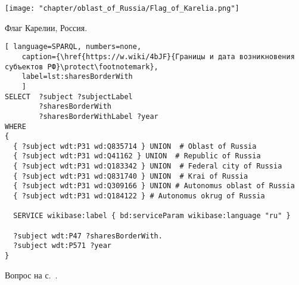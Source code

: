 \begin{task}
	\label{answer:subjects_of_Russia_1}
	
	\begin{marginfigure}[0.0cm]
{
	\setlength{\fboxsep}{0pt}%
	\setlength{\fboxrule}{1pt}%
	\texttt{[image: "chapter/oblast\_of\_Russia/Flag\_of\_Karelia.png"]}
}
\caption [Флаг Карелии, Россия.]{Флаг Карелии, Россия.}%
\label{fig:Flag_of_Karelia}%
\end{marginfigure}
	
	\begin{lstlisting}[ language=SPARQL, numbers=none,
	caption={\href{https://w.wiki/4bJF}{Границы и дата возникновения субъектов РФ}\protect\footnotemark},
	label=lst:sharesBorderWith
	]
SELECT  ?subject ?subjectLabel 
        ?sharesBorderWith 
        ?sharesBorderWithLabel ?year
WHERE
{
  { ?subject wdt:P31 wd:Q835714 } UNION  # Oblast of Russia
  { ?subject wdt:P31 wd:Q41162 } UNION  # Republic of Russia
  { ?subject wdt:P31 wd:Q183342 } UNION  # Federal city of Russia
  { ?subject wdt:P31 wd:Q831740 } UNION  # Krai of Russia
  { ?subject wdt:P31 wd:Q309166 } UNION # Autonomus oblast of Russia
  { ?subject wdt:P31 wd:Q184122 } # Autonomus okrug of Russia
  
  SERVICE wikibase:label { bd:serviceParam wikibase:language "ru" }
  
  ?subject wdt:P47 ?sharesBorderWith. 
  ?subject wdt:P571 ?year
}
\end{lstlisting}
	
\small{Вопрос на с.~\pageref{lst:sharesBorderWith-oblast-of-Russia}.}
\end{task}

